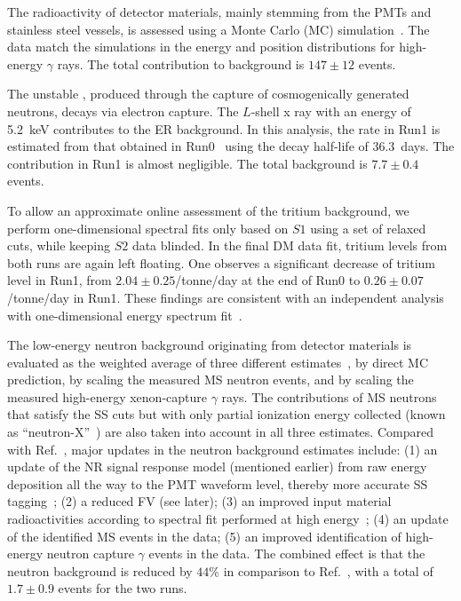 \documentclass[%
 reprint,
superscriptaddress,
 amsmath,amssymb,
 aps,
 prl,
]{revtex4-1}
\begin{document}
The radioactivity of detector materials, mainly stemming from the PMTs and stainless steel vessels, is assessed using a \Geantbased Monte Carlo (MC) simulation~\cite{Chen2021_BambooMC}.
The data match the simulations in the energy and position distributions for high-energy $\gamma$ rays. The total contribution to background is $147 \pm 12$ events.

The unstable , produced through the capture of cosmogenically generated neutrons, decays via electron capture. The $L$-shell x ray with an energy of 5.2~keV contributes to the ER background. In this analysis, the rate in Run1 is estimated from that obtained in Run0~\cite{Meng2021_P4First} using the decay half-life of 36.3~days. The contribution in Run1 is almost negligible. The total background is $7.7 \pm 0.4$ events.

To allow an approximate online assessment of the tritium background, we perform one-dimensional spectral fits only based on $S1$ using a set of relaxed cuts, while keeping $S2$ data blinded. In the final DM data fit, tritium levels from both runs are again left floating. One observes a significant decrease of tritium level in Run1, from $2.04 \pm 0.25$/tonne/day at the end of Run0 to $0.26 \pm 0.07$/tonne/day in Run1. These findings are consistent with an independent analysis with one-dimensional energy spectrum fit~\cite{Zeng2024_P4ERPhys}.

The low-energy neutron background originating from detector materials is evaluated as the weighted average of three different estimates~\cite{Huang2022_NeutronBG}, by direct MC prediction, by scaling the measured MS neutron events, and by scaling the measured high-energy xenon-capture $\gamma$ rays.
The contributions of MS neutrons that satisfy the SS cuts but with only partial ionization energy collected (known as ``neutron-X''~\cite{Huang2022_NeutronBG}) are also taken into account in all three estimates.
Compared with Ref.~\cite{Meng2021_P4First}, major updates in the neutron background estimates include:
(1) an update of the NR signal response model (mentioned earlier) from raw energy deposition all the way to the PMT waveform level, thereby more accurate SS tagging~\cite{Luo2024_P4SignalModel};
(2) a reduced FV (see later);
(3) an improved input material radioactivities according to spectral fit performed at high energy~\cite{Si2022_Xe136DBD};
(4) an update of the identified MS events in the data;
(5) an improved identification of high-energy neutron capture $\gamma$ events in the data.
The combined effect is that the neutron background is reduced by $44\%$ in comparison to Ref.~\cite{Meng2021_P4First}, with a total of $1.7 \pm 0.9$ events for the two runs.
\end{document}
